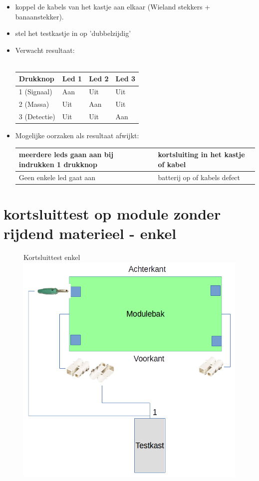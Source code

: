 \documentclass[12pt,a4paper]{report}
\begin{document}
\begin{itemize}
\item koppel de kabels van het kastje aan elkaar (Wieland stekkers + banaanstekker).
\item stel het testkastje in op 'dubbelzijdig' 
\item Verwacht resultaat:\\
\\
\begin{tabular}{|l|l|l|l|}
\hline
Drukknop&Led 1&Led 2&Led 3\\
\hline
1 (Signaal)&Aan&Uit&Uit\\
\hline
2 (Massa)&Uit&Aan&Uit\\
\hline
3 (Detectie)&Uit&Uit&Aan\\
\hline
\end{tabular}

\item Mogelijke oorzaken als resultaat afwijkt:\\
\begin{tabular}{|p{8cm}|p{6cm}|}
\hline
meerdere leds gaan aan bij indrukken 1 drukknop&kortsluiting in het kastje of kabel\\
\hline
Geen enkele led gaat aan&batterij op of kabels defect\\
\hline
\end{tabular}

\end{itemize}

\section{kortsluittest op module zonder rijdend materieel - enkel}

\begin{figure}[!ht]
  \captionbox
  {Kortsluittest enkel\label{im:test_enkel}}
  {\includegraphics[scale=0.8]{images/rcu_test_enkel}\\}
\end{figure}
\end{document}
